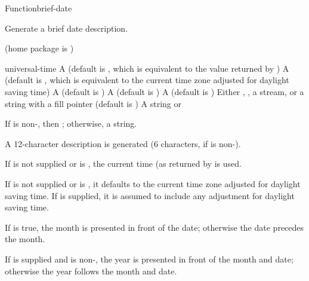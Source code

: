 \documentclass[10pt,twoside,english,pdftex]{article}
\begin{document}
\begin{functiondoc}{Function}{brief-date}{%
    }
% 
% 

\fnsyntax

\fnpurpose Generate a brief date description.

\fnpackage {} (home package is )

\fnmodule {}

\fnargs
\begin{args}{universal-time}
 A  (default is \nil,
  which is equivalent to the value returned by
  )
 A  (default is \nil,
  which is equivalent to the current time zone adjusted for daylight
  saving time)
 A  (default is 
)
 A  (default is \nil)
 A  (default is )
\arg[destination] Either \nil, , a stream, or a string with a fill 
pointer (default is \nil)
\arg[result] A string or \nil{}
\end{args}

\fnreturns If  is non-\nil, then \nil; otherwise, a string.

\fndescription
%
A 12-character description is generated (6 characters, if
 is non-\nil).

\W{}
%
If  is not supplied or is \nil, the current time
(as returned by  is used.  

\W{} 
%
If  is not supplied or is \nil, it defaults to the current
time zone adjusted for daylight saving time. If  is
supplied, it is assumed to include any adjustment for daylight saving time.

\W{} 
%
If  is true, the month is presented in front of the
date; otherwise the date precedes the month.

\W{} 
%
If  is supplied and is non-\nil, the year is presented in
front of the month and date; otherwise the year follows the month and date.


\end{functiondoc}
\end{document}
